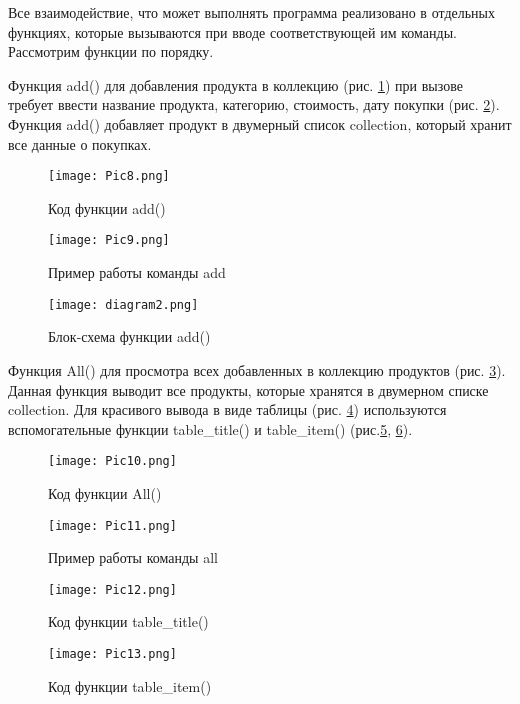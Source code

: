 \documentclass[14pt]{extreport}
\begin{document}
Все взаимодействие, что может выполнять программа реализовано в отдельных функциях, которые вызываются при вводе соответствующей им команды. Рассмотрим функции по порядку.

Функция add() для добавления продукта в коллекцию (рис. \ref{fig18}) при вызове требует ввести название продукта, категорию, стоимость, дату покупки (рис. \ref{fig19}).
Функция add() добавляет продукт в двумерный список collection, который хранит все данные о покупках.

\begin{figure}[H]
\centerline{\texttt{[image: Pic8.png]}}
\caption{Код функции add()}
\label{fig18}
\end{figure}

\begin{figure}[H]
\centerline{\texttt{[image: Pic9.png]}}
\caption{Пример работы команды add}
\label{fig19}
\end{figure}

\begin{figure}[H]
\centerline{\texttt{[image: diagram2.png]}}
\caption{Блок-схема функции add()}
\end{figure}

Функция All() для просмотра всех добавленных в коллекцию продуктов (рис. \ref{fig20}). 
Данная функция выводит все продукты, которые хранятся в двумерном списке collection.
Для красивого вывода в виде таблицы (рис. \ref{fig21}) используются вспомогательные функции table\_title() и table\_item() (рис.\ref{fig22}, \ref{fig23}). 

\begin{figure}[H]
\centerline{\texttt{[image: Pic10.png]}}
\caption{Код функции All()}
\label{fig20}
\end{figure}

\begin{figure}[H]
\centerline{\texttt{[image: Pic11.png]}}
\caption{Пример работы команды all}
\label{fig21}
\end{figure}

\begin{figure}[H]
\centerline{\texttt{[image: Pic12.png]}}
\caption{Код функции table\_title()}
\label{fig22}
\end{figure}

\begin{figure}[H]
\centerline{\texttt{[image: Pic13.png]}}
\caption{Код функции table\_item()}
\label{fig23}
\end{figure}
\end{document}
